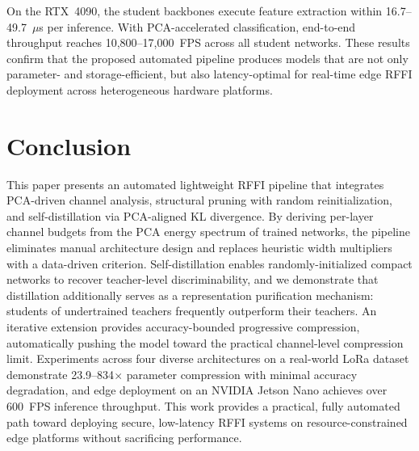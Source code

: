 \documentclass[journal,comsoc]{IEEEtran}
\begin{document}
On the RTX~4090, the student backbones execute feature extraction within 16.7--49.7~$\mu$s per inference.
With PCA-accelerated classification, end-to-end throughput reaches 10,800--17,000~FPS across all student networks.
These results confirm that the proposed automated pipeline produces models that are not only parameter- and storage-efficient, but also latency-optimal for real-time edge RFFI deployment across heterogeneous hardware platforms.


\section{Conclusion}
\label{sec:conclusion}
This paper presents an automated lightweight RFFI pipeline that integrates PCA-driven channel analysis, structural pruning with random reinitialization, and self-distillation via PCA-aligned KL divergence.
By deriving per-layer channel budgets from the PCA energy spectrum of trained networks, the pipeline eliminates manual architecture design and replaces heuristic width multipliers with a data-driven criterion.
Self-distillation enables randomly-initialized compact networks to recover teacher-level discriminability, and we demonstrate that distillation additionally serves as a representation purification mechanism: students of undertrained teachers frequently outperform their teachers.
An iterative extension provides accuracy-bounded progressive compression, automatically pushing the model toward the practical channel-level compression limit.
Experiments across four diverse architectures on a real-world LoRa dataset demonstrate 23.9--834$\times$ parameter compression with minimal accuracy degradation, and edge deployment on an NVIDIA Jetson Nano achieves over 600~FPS inference throughput.
This work provides a practical, fully automated path toward deploying secure, low-latency RFFI systems on resource-constrained edge platforms without sacrificing performance.




\end{document}

